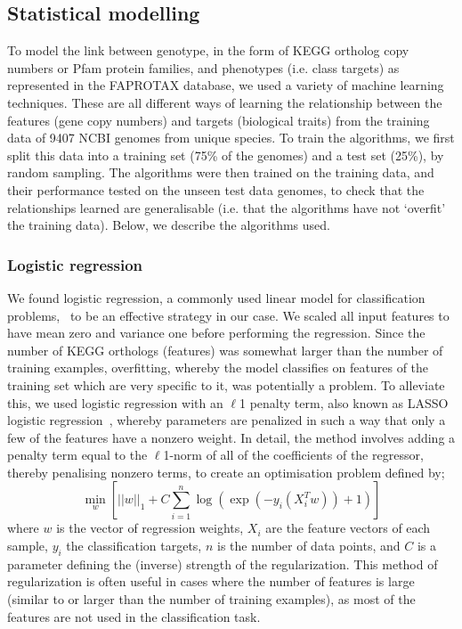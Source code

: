 \documentclass[10pt,letterpaper]{article}
\begin{document}
\subsection*{Statistical modelling}
To model the link between genotype, in the form of KEGG ortholog copy numbers or Pfam protein families, and phenotypes (i.e. class targets) as represented in the FAPROTAX database, we used a variety of machine learning techniques. These are all different ways of learning the relationship between the features (gene copy numbers) and targets (biological traits) from the training data of 9407 NCBI genomes from unique species. To train the algorithms, we first split this data into a training set (75\% of the genomes) and a test set (25\%), by random sampling. The algorithms were then trained on the training data, and their performance tested on the unseen test data genomes, to check that the relationships learned are generalisable (i.e. that the algorithms have not `overfit' the training data). Below, we describe the algorithms used.

\subsubsection*{Logistic regression}
We found logistic regression, a commonly used linear model for classification problems,~\cite{Hastie2009a,Freedman2009} to be an effective strategy in our case. We scaled all input features to have mean zero and variance one before performing the regression. Since the number of KEGG orthologs (features) was somewhat larger than the number of training examples, overfitting, whereby the model classifies on features of the training set which are very specific to it, was potentially a problem. To alleviate this, we used logistic regression with an $\ell$1 penalty term, also known as LASSO logistic regression~\cite{Lee2006}, whereby parameters are penalized in such a way that only a few of the features have a nonzero weight. In detail, the method involves adding a penalty term equal to the $\ell$1-norm of all of the coefficients of the regressor, thereby penalising nonzero terms, to create an optimisation problem defined by;
\begin{equation}
\min_{w}\left[||w||_1 + C\sum_{i=1}^{n}\log\left(\exp(-y_i(X_i^T w )) + 1\right)\right]
\end{equation}
where $w$ is the vector of regression weights, $X_i$ are the feature vectors of each sample, $y_i$ the classification targets, $n$ is the number of data points, and $C$ is a parameter defining the (inverse) strength of the regularization. This method of regularization is often useful in cases where the number of features is large (similar to or larger than the number of training examples), as most of the features are not used in the classification task. 
\end{document}
